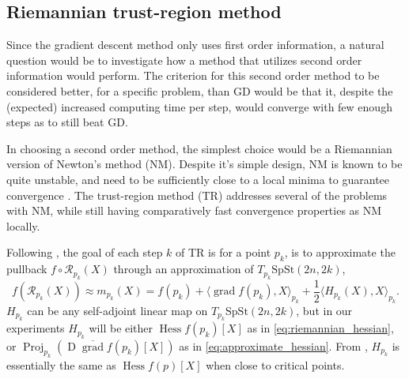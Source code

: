 \subsection{Riemannian trust-region method}
Since the gradient descent method only uses first order information, a natural question would be to investigate how a method that utilizes second order information would perform. The criterion for this second order method to be considered better, for a specific problem, than GD would be that it, despite the (expected) increased computing time per step, would converge with few enough steps as to still beat GD. 

In choosing a second order method, the simplest choice would be a Riemannian version of Newton's method (NM). Despite it's simple design, NM is known to be quite unstable, and need to be sufficiently close to a local minima to guarantee convergence \cite[p.~122]{Boumal2023}. The trust-region method (TR) addresses several of the problems with NM, while still having comparatively fast convergence properties as NM locally. 

Following \cite[p.~131]{Boumal2023}, the goal of each step $k$ of TR is for a point $p_{k}$, is to approximate the pullback $f\circ \mathcal{R}_{p_{k}}(X)$ through an approximation of $T_{p_{k}}\mathrm{SpSt}(2n, 2k)$,
%
\begin{equation*}
f(\mathcal{R}_{p_{k}}(X))\approx m_{p_{k}}(X)=f(p_{k})+\langle \operatorname{grad}f(p_{k}),X \rangle _{p_{k}}+ \frac{1}{2}\langle H_{p_{k}}(X),X \rangle _{p_{k}}.
\end{equation*}
%
$H_{p_{k}}$ can be any self-adjoint linear map on $T_{p_{k}}\mathrm{SpSt}(2n, 2k)$, but in our experiments $H_{p_{k}}$ will be either $\operatorname{Hess}f(p_{k})[X]$ as in \eqref{eq:riemannian_hessian}, or $\operatorname{Proj}_{p_{k}}(\operatorname{D}\overline{\operatorname{grad}}f(p_{k})[X])$ as in \eqref{eq:approximate_hessian}. From \cite[Prop.~5.44]{Boumal2023}, $H_{p_{k}}$ is essentially the same as $\operatorname{Hess}f(p)[X]$ when close to critical points. 

